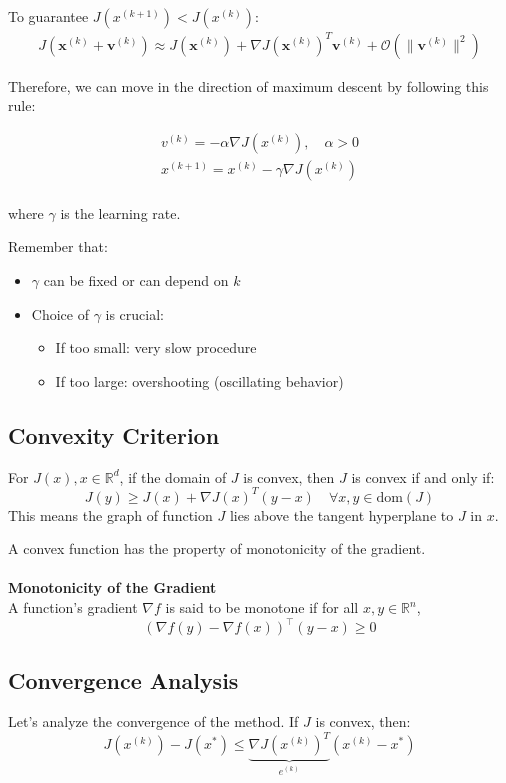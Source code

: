 To guarantee $J(x^{(k+1)}) < J(x^{(k)})$:
\[
\begin{aligned}
J(\mathbf{x}^{(k)} + \mathbf{v}^{(k)}) \approx J(\mathbf{x}^{(k)}) + \nabla J(\mathbf{x}^{(k)})^T\mathbf{v}^{(k)} + \mathcal{O}(\|\mathbf{v}^{(k)}\|^2)
\end{aligned}
\]

Therefore, we can move in the direction of maximum descent by following this rule:

\[
\begin{aligned}
v^{(k)} = -\alpha\nabla J(x^{(k)}), \quad \alpha > 0 \\
x^{(k+1)} = x^{(k)} - \gamma \nabla J(x^{(k)})\\
\end{aligned}
\]

where $\gamma$ is the learning rate.


Remember that:
\begin{itemize}
    \item $\gamma$ can be fixed or can depend on $k$
    \item Choice of $\gamma$ is crucial:
    \begin{itemize}
        \item If too small: very slow procedure
        \item If too large: overshooting (oscillating behavior)
    \end{itemize}
\end{itemize}

\subsection*{Convexity Criterion}
For $J(x), x \in \mathbb{R}^d$, if the domain of $J$ is convex, then $J$ is convex if and only if:
\[
J(y) \geq J(x) + \nabla J(x)^T(y-x) \quad \forall x, y \in \text{dom}(J)
\]
This means the graph of function $J$ lies above the tangent hyperplane to $J$ in $x$.

A convex function has the property of monotonicity of the gradient.\\ \\
\textbf{Monotonicity of the Gradient} \\
A function's gradient \( \nabla f \) is said to be monotone if for all \( x, y \in \mathbb{R}^n \),
\[
(\nabla f(y) - \nabla f(x))^\top (y - x) \geq 0
\]

\subsection{Convergence Analysis}
Let's analyze the convergence of the method. If $J$ is convex, then:
\[
J(x^{(k)}) - J(x^*) \leq \underbrace{\nabla J(x^{(k)})^T}_{e^{(k)}}(x^{(k)} - x^*)
\]

